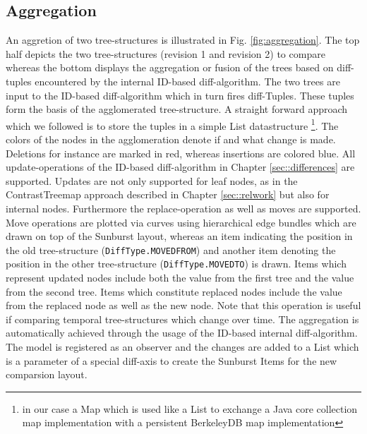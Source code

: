 \subsection{Aggregation}\label{subsec::aggregation}
An aggretion of two tree-structures is illustrated in Fig. \ref{fig:aggregation}. The top half depicts the two tree-structures (revision 1 and revision 2) to compare whereas the bottom displays the aggregation or fusion of the trees based on diff-tuples encountered by the internal ID-based diff-algorithm. The two trees are input to the ID-based diff-algorithm which in turn fires diff-Tuples. These tuples form the basis of the agglomerated tree-structure. A straight forward approach which we followed is to store the tuples in a simple List datastructure \footnote{in our case a Map which is used like a List to exchange a Java core collection map implementation with a persistent BerkeleyDB map implementation}. The colors of the nodes in the agglomeration denote if and what change is made. Deletions for instance are marked in red, whereas insertions are colored blue. All update-operations of the ID-based diff-algorithm in Chapter \ref{sec::differences} are supported. Updates are not only supported for leaf nodes, as in the ContrastTreemap approach described in Chapter \ref{sec::relwork} but also for internal nodes. Furthermore the replace-operation as well as moves are supported. Move operations are plotted via curves using hierarchical edge bundles which are drawn on top of the Sunburst layout, whereas an item indicating the position in the old tree-structure (\texttt{DiffType.MOVEDFROM}) and another item denoting the position in the other tree-structure (\texttt{DiffType.MOVEDTO}) is drawn. Items which represent updated nodes include both the value from the first tree and the value from the second tree. Items which constitute replaced nodes include the value from the replaced node as well as the new node. Note that this operation is useful if comparing temporal tree-structures which change over time. The aggregation is automatically achieved through the usage of the ID-based internal diff-algorithm. The model is registered as an observer and the changes are added to a List which is a parameter of a special diff-axis to create the Sunburst Items for the new comparsion layout.

